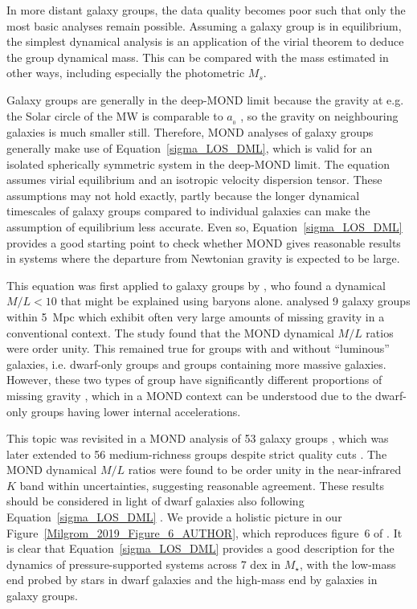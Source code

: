 \documentclass[fleqn,usenatbib,useAMS]{mnras} %
\begin{document}
In more distant galaxy groups, the data quality becomes poor such that only the most basic analyses remain possible. Assuming a galaxy group is in equilibrium, the simplest dynamical analysis is an application of the virial theorem to deduce the group dynamical mass. This can be compared with the mass estimated in other ways, including especially the photometric $M_s$.

Galaxy groups are generally in the deep-MOND limit because the gravity at e.g. the Solar circle of the MW is comparable to $a_{_0}$ \citep{Klioner_2021}, so the gravity on neighbouring galaxies is much smaller still. Therefore, MOND analyses of galaxy groups generally make use of Equation~\ref{sigma_LOS_DML}, which is valid for an isolated spherically symmetric system in the deep-MOND limit. The equation assumes virial equilibrium and an isotropic velocity dispersion tensor. These assumptions may not hold exactly, partly because the longer dynamical timescales of galaxy groups compared to individual galaxies can make the assumption of equilibrium less accurate. Even so, Equation~\ref{sigma_LOS_DML} provides a good starting point to check whether MOND gives reasonable results in systems where the departure from Newtonian gravity is expected to be large.

This equation was first applied to galaxy groups by \citet{Milgrom_1998}, who found a dynamical $M/L < 10$ that might be explained using baryons alone. \citet{Milgrom_2002} analysed 9 galaxy groups within 5~Mpc which exhibit often very large amounts of missing gravity in a conventional context. The study found that the MOND dynamical $M/L$ ratios were order unity. This remained true for groups with and without ``luminous'' galaxies, i.e. dwarf-only groups and groups containing more massive galaxies. However, these two types of group have significantly different proportions of missing gravity \citep{Tully_2002}, which in a MOND context can be understood due to the dwarf-only groups having lower internal accelerations.

This topic was revisited in a MOND analysis of 53 galaxy groups \citep{Milgrom_2018}, which was later extended to 56 medium-richness groups despite strict quality cuts \citep{Milgrom_2019}. The MOND dynamical $M/L$ ratios were found to be order unity in the near-infrared $K$ band within uncertainties, suggesting reasonable agreement. These results should be considered in light of dwarf galaxies also following Equation~\ref{sigma_LOS_DML} \citep[e.g.][]{McGaugh_2021}. We provide a holistic picture in our Figure~\ref{Milgrom_2019_Figure_6_AUTHOR}, which reproduces figure~6 of \citet{Milgrom_2019}. It is clear that Equation~\ref{sigma_LOS_DML} provides a good description for the dynamics of pressure-supported systems across 7 dex in $M_{\star}$, with the low-mass end probed by stars in dwarf galaxies and the high-mass end by galaxies in galaxy groups.
\end{document}
